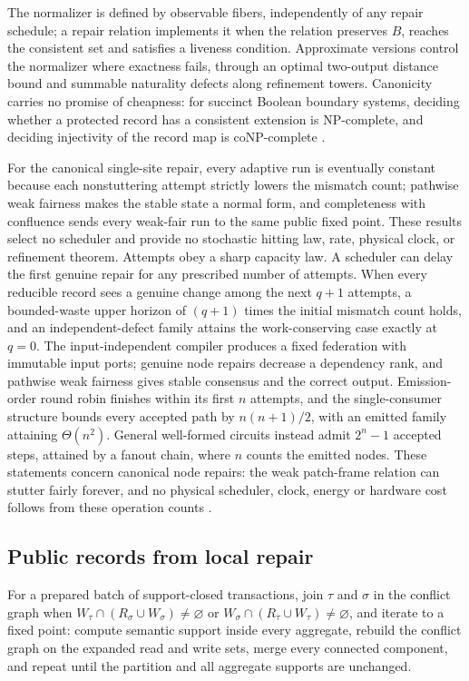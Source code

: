 \documentclass[11pt]{article}
\theoremstyle{definition}
\theoremstyle{remark}
\begin{document}
The normalizer is defined by observable fibers, independently of any repair
schedule; a repair relation implements it when the relation preserves $B$,
reaches the consistent set and satisfies a liveness condition. Approximate
versions control the normalizer where exactness fails, through an optimal
two-output distance bound and summable naturality defects along refinement
towers. Canonicity carries no promise of cheapness: for succinct Boolean
boundary systems, deciding whether a protected record has a consistent
extension is NP-complete, and deciding injectivity of the record map is
coNP-complete \cite{ophnormalforms}.

For the canonical single-site repair, every adaptive run is eventually
constant because each nonstuttering attempt strictly lowers the mismatch
count; pathwise weak fairness makes the stable state a normal form, and
completeness with confluence sends every weak-fair run to the same public
fixed point. These results select no scheduler and provide no stochastic hitting law, rate, physical clock, or refinement theorem.
Attempts obey a sharp capacity law. A scheduler can delay the first genuine repair for any prescribed number of attempts. When every reducible record sees a genuine change among the next $q+1$ attempts, a bounded-waste upper horizon of $(q+1)$ times the initial mismatch count holds, and an independent-defect family attains the work-conserving case exactly at $q=0$.
The input-independent compiler produces a fixed federation with immutable input ports;
genuine node repairs decrease a dependency rank, and pathwise weak fairness
gives stable consensus and the correct output.
Emission-order round robin finishes within its first $n$ attempts, and the single-consumer structure bounds every accepted path by $n(n+1)/2$, with an emitted family attaining $\Theta(n^2)$.
General well-formed circuits instead admit $2^n-1$ accepted steps, attained by a fanout chain, where $n$ counts the emitted nodes.
These statements concern canonical node repairs: the weak patch-frame relation can stutter fairly forever, and no physical scheduler, clock, energy or hardware cost follows from these operation counts \cite{ophnormalforms,ophconsensus}.

\subsection{Public records from local repair}

For a prepared batch of support-closed transactions, join $\tau$ and $\sigma$
in the conflict graph when
$W_\tau\cap(R_\sigma\cup W_\sigma)\ne\varnothing$ or
$W_\sigma\cap(R_\tau\cup W_\tau)\ne\varnothing$, and iterate to a fixed
point: compute semantic support inside every aggregate, rebuild the conflict
graph on the expanded read and write sets, merge every connected component,
and repeat until the partition and all aggregate supports are unchanged.
\end{document}
